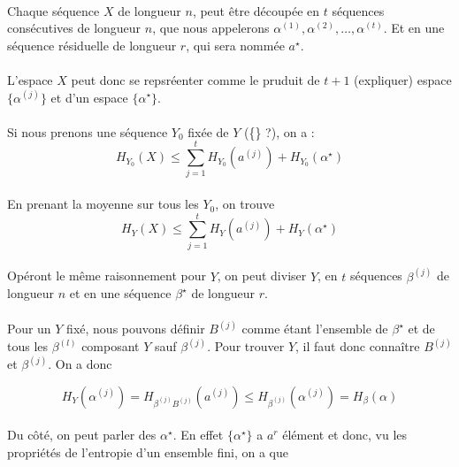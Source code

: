	\paragraph{}
	Chaque séquence $X$ de longueur $n$, peut être découpée en $t$ séquences consécutives de longueur $n$, que nous appelerons $\alpha^{(1)}, \alpha^{(2)}, \dots, \alpha^{(t)}$.
	Et en une séquence résiduelle de longueur $r$, qui sera nommée $a^\star$.
	
	\paragraph{}
	L'espace ${X}$ peut donc se repsréenter comme le pruduit de $t+1$ (expliquer) espace $\{\alpha^{(j)}\}$ et d'un espace $\{\alpha^\star\}$.
	
	\paragraph{}
	Si nous prenons une séquence $Y_0$ fixée de $Y$ (\{\} ?), on a :
	\[H_{Y_0}(X)\le \sum_{j=1}^tH_{Y_0}\left(a^{(j)}\right)+H_{Y_0}(\alpha^\star)\]
	
	\paragraph{}
	En prenant la moyenne sur tous les $Y_0$, on trouve
	\[H_Y(X)\le \sum_{j=1}^tH_Y\left(a^{(j)}\right)+H_Y(\alpha^\star)\]
	
	\paragraph{}
	Opéront le même raisonnement pour $Y$, on peut diviser $Y$, en $t$ séquences $\beta^{(j)}$ de longueur $n$ et en une séquence ${\beta^\star}$ de longueur $r$. 
	
	\paragraph{}
	Pour un $Y$ fixé, nous pouvons définir $B^{(j)}$ comme étant l'ensemble de $\beta^\star$ et de tous les $\beta^{(l)}$ composant $Y$ sauf $\beta^{(j)}$.
	Pour trouver $Y$, il faut donc connaître $B^{(j)}$ et $\beta^{(j)}$. On a donc
	
	\[H_Y(\alpha^{(j)}) = H_{\beta^{(j)}B^{(j)}}\left(a^{(j)}\right) \le H_{\beta^{(j)}}\left(\alpha^{(j)}\right)=H_\beta(\alpha) \]
	
	\paragraph{}
	Du côté, on peut parler des $\alpha^\star$. En effet $\{\alpha^\star\}$ a $a^r$ élément et donc, vu les propriétés de l'entropie d'un ensemble fini, on a que
	

